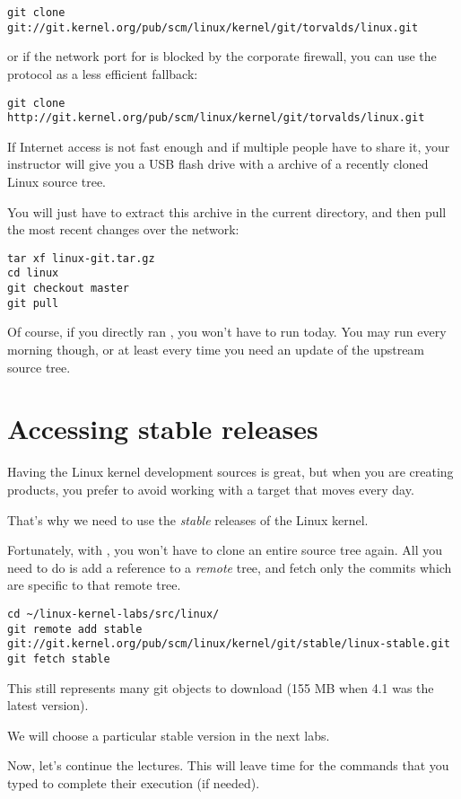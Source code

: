 {\small
\begin{verbatim}
git clone git://git.kernel.org/pub/scm/linux/kernel/git/torvalds/linux.git
\end{verbatim}
}

or if the network port for  is blocked by the corporate
firewall, you can use the  protocol as a less efficient
fallback:

{\small
\begin{verbatim}
git clone http://git.kernel.org/pub/scm/linux/kernel/git/torvalds/linux.git
\end{verbatim}
}

If Internet access is not fast enough and if multiple people have to
share it, your instructor will give you a USB flash drive with a
 archive of a recently cloned Linux source tree.

You will just have to extract this archive in the current directory,
and then pull the most recent changes over the network:

\begin{verbatim}
tar xf linux-git.tar.gz
cd linux
git checkout master
git pull
\end{verbatim}

Of course, if you directly ran , you won't have to run
 today. You may run  every morning though,
or at least every time you need an update of the upstream source tree.

\section{Accessing stable releases}

Having the Linux kernel development sources is great, but when you are
creating products, you prefer to avoid working with a target that moves
every day.

That's why we need to use the {\em stable} releases of the Linux
kernel.

Fortunately, with , you won't have to clone an entire source
tree again. All you need to do is add a reference to a {\em remote}
tree, and fetch only the commits which are specific to that remote tree.

{\footnotesize
\begin{verbatim}
cd ~/linux-kernel-labs/src/linux/
git remote add stable git://git.kernel.org/pub/scm/linux/kernel/git/stable/linux-stable.git
git fetch stable
\end{verbatim}
}

This still represents many git objects to download (155 MB when 4.1 was
the latest version).

We will choose a particular stable version in the next labs.

Now, let's continue the lectures. This will leave time for the commands
that you typed to complete their execution (if needed).

